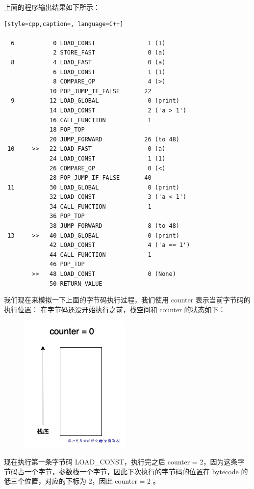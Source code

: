 上面的程序输出结果如下所示：
\begin{lstlisting}[style=cpp,caption=, language=C++]

  6           0 LOAD_CONST               1 (1)
              2 STORE_FAST               0 (a)
  8           4 LOAD_FAST                0 (a)
              6 LOAD_CONST               1 (1)
              8 COMPARE_OP               4 (>)
             10 POP_JUMP_IF_FALSE       22
  9          12 LOAD_GLOBAL              0 (print)
             14 LOAD_CONST               2 ('a > 1')
             16 CALL_FUNCTION            1
             18 POP_TOP
             20 JUMP_FORWARD            26 (to 48)
 10     >>   22 LOAD_FAST                0 (a)
             24 LOAD_CONST               1 (1)
             26 COMPARE_OP               0 (<)
             28 POP_JUMP_IF_FALSE       40
 11          30 LOAD_GLOBAL              0 (print)
             32 LOAD_CONST               3 ('a < 1')
             34 CALL_FUNCTION            1
             36 POP_TOP
             38 JUMP_FORWARD             8 (to 48)
 13     >>   40 LOAD_GLOBAL              0 (print)
             42 LOAD_CONST               4 ('a == 1')
             44 CALL_FUNCTION            1
             46 POP_TOP
        >>   48 LOAD_CONST               0 (None)
             50 RETURN_VALUE
\end{lstlisting}
我们现在来模拟一下上面的字节码执行过程，我们使用 counter 表示当前字节码的执行位置：
在字节码还没开始执行之前，栈空间和 counter 的状态如下：

    \begin{figure}[H]
        \centering
            \includegraphics[scale=.25]{images/56-bytecode.png}
						\caption{ }
        \label{fig:my_label}
    \end{figure}
    
现在执行第一条字节码 LOAD\_CONST，执行完之后 counter = 2，因为这条字节码占一个字节，参数栈一个字节，因此下次执行的字节码的位置在 bytecode 的低三个位置，对应的下标为 2，因此 counter = 2 。

